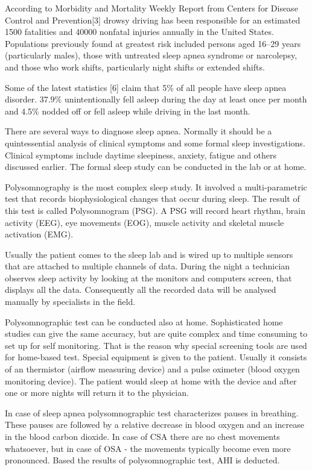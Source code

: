 \documentclass[12pt,a4paper]{report}
\begin{document}
According to Morbidity and Mortality Weekly Report from Centers for Disease Control and Prevention[3] drowsy driving has been responsible for an estimated 1500 fatalities and 40000 nonfatal injuries annually in the United States. Populations previously found at greatest risk included persons aged 16--29 years (particularly males), those with untreated sleep apnea syndrome or narcolepsy, and those who work shifts, particularly night shifts or extended shifts.

Some of the latest statistics [6] claim that 5\% of all people have sleep apnea disorder. 37.9\% unintentionally fell asleep during the day at least once per month and 4.5\% nodded off or fell asleep while driving in the last month.

There are several ways to diagnose sleep apnea. Normally it should be a quintessential analysis of clinical symptoms and some formal sleep investigations. Clinical symptoms include daytime sleepiness, anxiety, fatigue and others discussed earlier. The formal sleep study can be conducted in the lab or at home. 

Polysomnography is the most complex sleep study. It involved a multi-parametric test that records biophysiological changes that occur during sleep. The result of this test is called Polysomnogram (PSG). A PSG will record heart rhythm, brain activity (EEG), eye movements (EOG), muscle activity and skeletal muscle activation (EMG). 

Usually the patient comes to the sleep lab and is wired up to multiple sensors that are attached to multiple channels of data. During the night a technician observes sleep activity by looking at the monitors and computers screen, that displays all the data. Consequently all the recorded data will be analysed manually by specialists in the field.

Polysomnographic test can be conducted also at home. Sophisticated home studies can give the same accuracy, but are quite complex and time consuming to set up for self monitoring. That is the reason why special screening tools are used for home-based test. Special equipment is given to the patient. Usually it consists of an thermistor (airflow measuring device) and a pulse oximeter (blood oxygen monitoring device). The patient would sleep at home with the device and after one or more nights will return it to the physician. 

In case of sleep apnea polysomnographic test characterizes pauses in breathing. These pauses are followed by a relative decrease in blood oxygen and an increase in the blood carbon dioxide. In case of CSA there are no chest movements whatsoever, but in case of OSA - the movements typically become even more pronounced. Based the results of polysomnographic test, AHI is deducted. 
\end{document}
